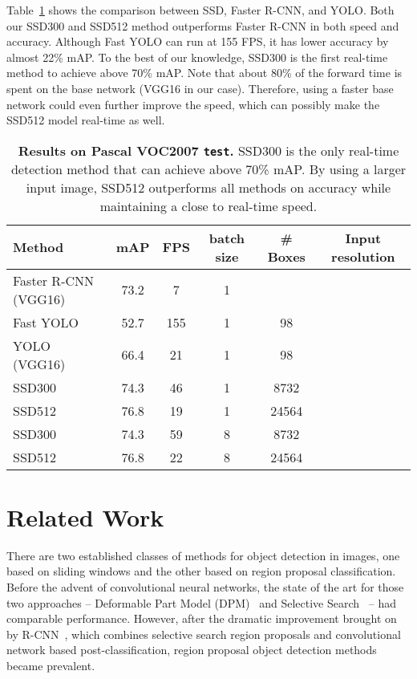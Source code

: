 \documentclass[runningheads]{llncs}
\begin{document}
Table~\ref{tab:inference} shows the comparison between SSD, Faster R-CNN\cite{ren2015faster}, and YOLO\cite{redmon2015you}. Both our SSD300 and SSD512 method outperforms Faster R-CNN in both speed and accuracy. Although Fast YOLO\cite{redmon2015you} can run at 155 FPS, it has lower accuracy by almost 22\% mAP. To the best of our knowledge, SSD300 is the first real-time method to achieve above 70\% mAP. Note that about 80\% of the forward time is spent on the base network (VGG16 in our case). Therefore, using a faster base network could even further improve the speed, which can possibly make the SSD512 model real-time as well.
\begin{table}
	\centering
    \setlength{\tabcolsep}{5pt}
    \begin{tabular}{l|c|c|c|c|c}
		Method & mAP & FPS & batch size & \# Boxes & Input resolution \\
        \hline
        Faster R-CNN (VGG16) & 73.2 & 7 & 1 &  & \\
        \hline 
        Fast YOLO & 52.7 & 155 & 1 & 98 & \\
        YOLO (VGG16) & 66.4 & 21 & 1 & 98 & \\
        \hline
        SSD300 & 74.3 & 46 & 1 & 8732 &  \\
        SSD512 & 76.8 & 19 & 1 & 24564 &  \\
        SSD300 & 74.3 & 59 & 8 & 8732 &  \\
        SSD512 & 76.8 & 22 & 8 & 24564 &  \\
	\end{tabular}
    \caption{\textbf{Results on Pascal VOC2007 \texttt{test}.} SSD300 is the only real-time detection method that can achieve above 70\% mAP. By using a larger input image, SSD512 outperforms all methods on accuracy while maintaining a close to real-time speed.}
    \label{tab:inference}
\end{table}

\section{Related Work}
\label{sec:relatedwork}
There are two established classes of methods for object detection in images, one based on sliding windows and the other based on region proposal classification. Before the advent of convolutional neural networks, the state of the art for those two approaches -- Deformable Part Model (DPM)~\cite{felzenszwalb2008discriminatively} and Selective Search~\cite{uijlings2013selective} -- had comparable performance. However, after the dramatic improvement brought on by R-CNN~\cite{girshick2014rich}, which combines selective search region proposals and convolutional network based post-classification, region proposal object detection methods became prevalent.
\end{document}
